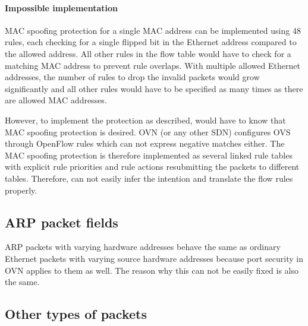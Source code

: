 \paragraph{Impossible implementation} MAC spoofing protection for a single MAC address can be implemented using 48 rules, each checking for a single flipped bit in the Ethernet address compared to the allowed address. All other rules in the flow table would have to check for a matching MAC address to prevent rule overlaps. With multiple allowed Ethernet addresses, the number of rules to drop the invalid packets would grow significantly and all other rules would have to be specified as many times as there are allowed MAC addresses.

However, to implement the protection as described,  would have to know that MAC spoofing protection is desired. OVN (or any other SDN) configures OVS through OpenFlow rules which can not express negative matches either. The MAC spoofing protection is therefore implemented as several linked rule tables with explicit rule priorities and rule actions resubmitting the packets to different tables. Therefore,  can not easily infer the intention and translate the flow rules properly.


\subsection{ARP packet fields}

ARP packets with varying hardware addresses behave the same as ordinary Ethernet packets with varying source hardware addresses because port security in OVN applies to them as well. The reason why this can not be easily fixed is also the same.

\subsection{Other types of packets}


